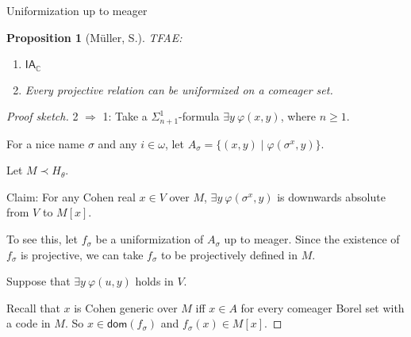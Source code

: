 \documentclass[handout, dvipsnames, usenames, 9pt, serif]{beamer}
\newtheorem{proposition}{Proposition}
\newcommand{\CC}{\mathbb{C}}
\newcommand{\IA}{\mathsf{IA}}
\newcommand{\dom}{\mathsf{dom}}
\newcommand{\cb}{\color{blue}}
\begin{document}
\begin{frame}{Uniformization up to meager} 

\begin{proposition}[M\"uller, S.] 
TFAE: 
\begin{enumerate} 
\item[1.]  
$\IA_\CC$ 
\item[2.] 
Every projective relation can be uniformized on a {\cb comeager set}. 
\end{enumerate} 
\end{proposition} 
\pause  

\medskip 
\begin{proof}[Proof sketch] 
{\color{blue} 2 $\Rightarrow$ 1: }  
Take a $\Sigma^1_{n+1}$-formula $\exists y\ \varphi(x,y)$, where $n\geq 1$. 
\pause  

\medskip 
For a nice name $\sigma$ and any $i\in\omega$, let $A_\sigma=\{(x,y) \mid \varphi(\sigma^x,y)\}$. 

\medskip 
Let $M\prec H_\theta$. 
\pause  

\medskip 
{\color{blue} Claim:}  
For any Cohen real $x\in V$ over $M$, $\exists y\ \varphi(\sigma^x,y)$ is downwards absolute from $V$ to $M[x]$.
\pause  

\medskip 
To see this, let $f_\sigma$ be a uniformization of $A_\sigma$ up to meager. Since the existence of $f_\sigma$ is projective, we can take $f_\sigma$ to be projectively defined in $M$. 

\medskip 
Suppose that $\exists y\ \varphi(u,y)$ holds in $V$. 

\medskip 
Recall that $x$ is Cohen generic over $M$ iff $x\in A$ for every comeager Borel set with a code in $M$. So $x\in \dom(f_\sigma)$ and $f_\sigma(x)\in M[x]$. 
\end{proof} 

\end{frame}
\end{document}

